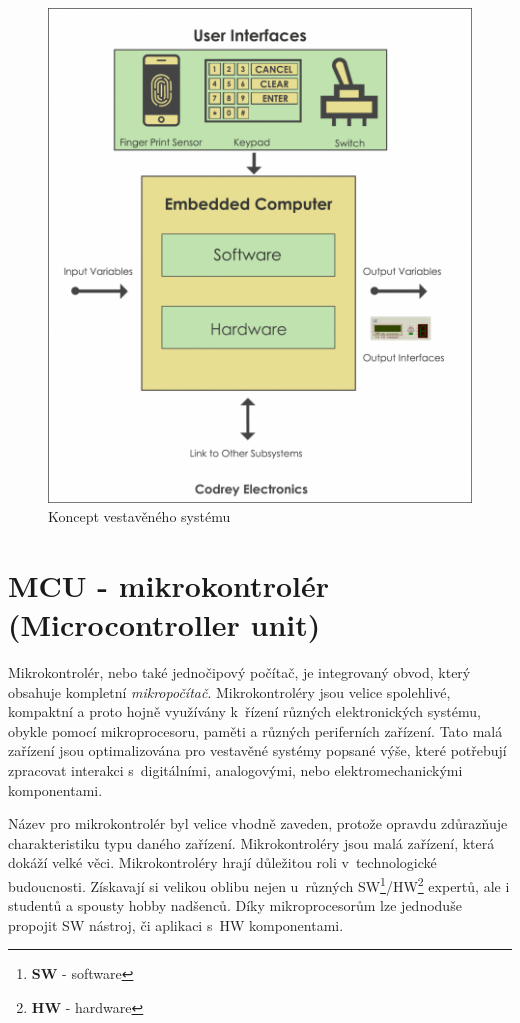 \begin{figure}[hbt]
  \centering
  \includegraphics[width=.6 \linewidth]{obrazky-figures/embedded_system.png}
  \caption{
    Koncept vestavěného systému
  }
  \label{figure:embedded}
\end{figure}

\newpage
\section{MCU - mikrokontrolér (Microcontroller unit)}
\label{terminy:mcu}

Mikrokontrolér, nebo také jednočipový počítač, je integrovaný obvod, který obsahuje kompletní \emph{mikropočítač}.
Mikrokontroléry jsou velice spolehlivé, kompaktní a proto hojně využívány k~řízení různých elektronických systému, obykle pomocí mikroprocesoru, paměti a různých periferních zařízení.
Tato malá zařízení jsou optimalizována pro vestavěné systémy popsané výše, které potřebují zpracovat interakci s~digitálními, analogovými, nebo elektromechanickými komponentami.

Název pro mikrokontrolér byl velice vhodně zaveden, protože opravdu zdůrazňuje charakteristiku typu daného zařízení. Mikrokontroléry jsou malá zařízení, která dokáží velké věci.
Mikrokontroléry hrají důležitou roli v~technologické budoucnosti. Získavají si velikou oblibu nejen u~různých SW\footnote{\textbf{SW} - software}/HW\footnote{\textbf{HW} - hardware} expertů, ale i studentů a spousty hobby nadšenců.\cite{mcu:info}
Díky mikroprocesorům lze jednoduše propojit SW nástroj, či aplikaci s~HW komponentami.

